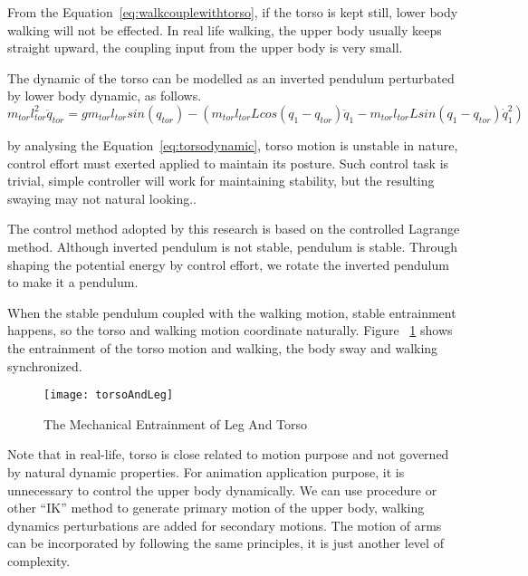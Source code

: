 {From the Equation~\ref{eq:walkcouplewithtorso}, if the torso is kept still, lower body walking will not be effected.
In real life walking, the upper body usually keeps straight upward, the coupling input from the upper body is very small.



The dynamic of the torso can be modelled as an inverted pendulum perturbated by lower body dynamic, as follows.
\begin{equation}
\label{eq:torsodynamic}
m_{tor}l_{tor}^{2}\ddot{q}_{tor}=gm_{tor}l_{tor}sin(q_{tor})-(m_{tor}l_{tor}Lcos(q_{1}-q_{tor})\ddot{q}_{1}-m_{tor}l_{tor}Lsin(q_{1}-q_{tor})\dot{q}_{1}^{2})
\end{equation}

by analysing the Equation~\ref{eq:torsodynamic},  torso motion is unstable in nature,  control effort must exerted applied to maintain its posture.
Such control task is trivial, simple \pd controller will work for maintaining stability, but the resulting swaying may not natural looking..

The control method adopted by this research is based on the controlled Lagrange method.
Although inverted pendulum is not stable, pendulum is stable.
Through shaping the potential energy by control effort, we  rotate the inverted pendulum to make it a pendulum.

When the stable pendulum coupled with the walking motion, stable entrainment happens, so the torso and walking motion coordinate naturally. 
Figure ~\ref{fig:torsolegentrainment} shows the entrainment of the torso motion and walking, the body sway and walking synchronized.
\begin{figure}[!htbp]
  \begin{center}
      \texttt{[image: torsoAndLeg]}
    \caption{The Mechanical Entrainment of Leg And Torso}
    \label{fig:torsolegentrainment}
\end{center}
\end{figure}




Note that in real-life, torso is close related to motion purpose and not governed by natural dynamic properties.
For animation application purpose,  it is unnecessary to control the upper body dynamically.
We can use procedure or other ``IK'' method to generate primary  motion of the upper body, walking dynamics perturbations are added for secondary motions.
The motion of arms can be incorporated by following the same principles, it is just another level of complexity.


}
